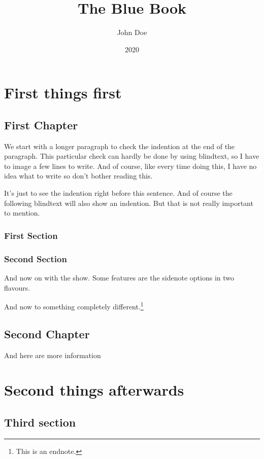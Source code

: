 \documentclass[english]{tex/bluebook}
\title{The Blue Book}
\author{John Doe}
\date{2020}
\begin{document}
	\maketitle	
	\frontmatter
	\tableofcontents

	\mainmatter
	\part{First things first}
	\chapter{First Chapter}
	We start with a longer paragraph to check the indention at the end of the paragraph.
	This particular check can hardly be done by using blindtext, so I have to image a few lines to write. And of course, like every time doing this, I have no idea what to write so don't bother reading this.
	
	It's just to see the indention right before this sentence. And of course the following blindtext will also show an indention. But that is not really important to mention.
	
	\blindtext[2]
	\section{First Section}
	\blindtext[15]
	\section{Second Section}
	And now on with the show. Some features are the sidenote options in two flavours.
	\blindtext[15]
	
	And now to something completely different.\footnote{This is an endnote.}
	
	\chapter{Second Chapter}
	And here are more information 
	\blindtext[25]
	\part{Second things afterwards}
	\chapter{Third section}
	\blindtext[30]
	
	\cleardoublepage
	\printendnotes	
	\printindex
	\cleardoubleemptypage
\end{document}
